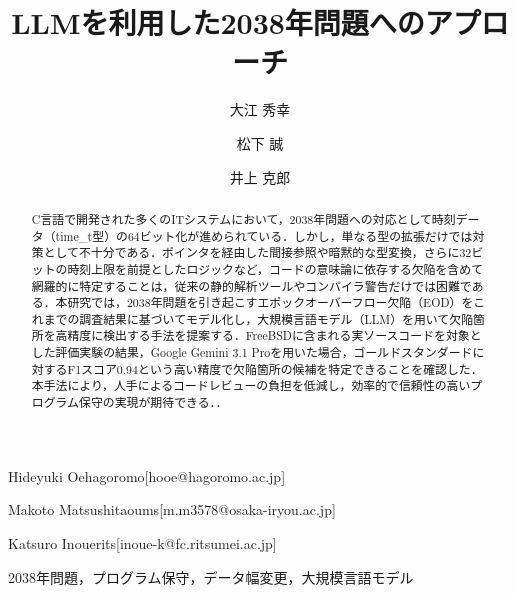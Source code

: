 \documentclass[submit,techrep,noauthor]{ipsj}
\begin{document}
\title{LLMを利用した2038年問題へのアプローチ}



\author{大江 秀幸}{Hideyuki Oe}{hagoromo}[hooe@hagoromo.ac.jp]
\author{松下 誠}{Makoto Matsushita}{oums}[m.m3578@osaka-iryou.ac.jp]
\author{井上 克郎}{Katsuro Inoue}{rits}[inoue-k@fc.ritsumei.ac.jp]

\begin{abstract}
	C言語で開発された多くのITシステムにおいて，2038年問題への対応として時刻データ（time\_t型）の64ビット化が進められている．しかし，単なる型の拡張だけでは対策として不十分である．ポインタを経由した間接参照や暗黙的な型変換，さらに32ビットの時刻上限を前提としたロジックなど，コードの意味論に依存する欠陥を含めて網羅的に特定することは，従来の静的解析ツールやコンパイラ警告だけでは困難である．本研究では，2038年問題を引き起こすエポックオーバーフロー欠陥（EOD）をこれまでの調査結果に基づいてモデル化し，大規模言語モデル（LLM）を用いて欠陥箇所を高精度に検出する手法を提案する．FreeBSDに含まれる実ソースコードを対象とした評価実験の結果，Google Gemini 3.1 Proを用いた場合，ゴールドスタンダードに対するF1スコア0.94という高い精度で欠陥箇所の候補を特定できることを確認した．本手法により，人手によるコードレビューの負担を低減し，効率的で信頼性の高いプログラム保守の実現が期待できる．．
\end{abstract}

\begin{jkeyword}
2038年問題，プログラム保守，データ幅変更，大規模言語モデル
\end{jkeyword}
\end{document}
